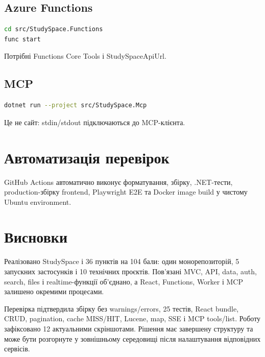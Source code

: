 \documentclass[12pt,a4paper]{article}
\begin{document}
\subsection{Azure Functions}
\begin{lstlisting}[language=bash]
cd src/StudySpace.Functions
func start
\end{lstlisting}
Потрібні Functions Core Tools і StudySpaceApiUrl.

\subsection{MCP}
\begin{lstlisting}[language=bash]
dotnet run --project src/StudySpace.Mcp
\end{lstlisting}
Це не сайт: stdin/stdout підключаються до MCP-клієнта.

\section{Автоматизація перевірок}
GitHub Actions автоматично виконує форматування, збірку, .NET-тести,
production-збірку frontend, Playwright E2E та Docker image build у чистому
Ubuntu environment.

\section{Висновки}
Реалізовано StudySpace і 36 пунктів на 104 бали: один монорепозиторій,
5 запускних застосунків і 10 технічних проєктів. Пов'язані MVC, API, data,
auth, search, files і realtime-функції об'єднано, а React, Functions, Worker
і MCP залишено окремими процесами.

Перевірка підтвердила збірку без warnings/errors, 25 тестів, React bundle, CRUD,
pagination, cache MISS/HIT, Lucene, map, SSE і MCP tools/list. Роботу
зафіксовано 12 актуальними скріншотами. Рішення має завершену структуру та
може бути розгорнуте у зовнішньому середовищі після налаштування відповідних
сервісів.
\end{document}
